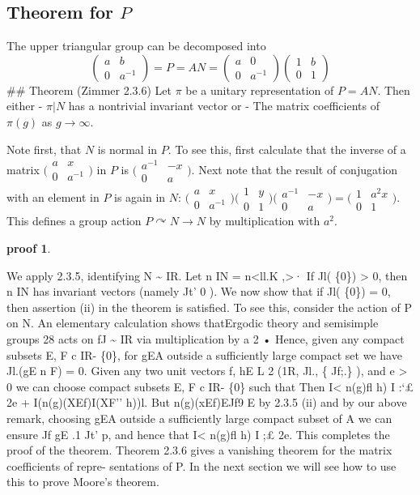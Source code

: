 \documentclass[
]{article}
\theoremstyle{break}
\theoremstyle{plain}
\newtheorem*{pf}{proof}
\newcommand{\ipmatrix}[1]{%
\ensuremath{\big(\begin{smallmatrix} #1 \end{smallmatrix}\big)}}
\begin{document}
\hypertarget{theorem-for-p}{%
\subsection{Theorem for \texorpdfstring{$P$}{P}}\label{theorem-for-p}}

The upper triangular group can be decomposed into
\[\begin{pmatrix}a & b \\ 0 & a^{-1}\end{pmatrix} =
P = AN =
\begin{pmatrix}a & 0 \\ 0 & a^{-1}\end{pmatrix} \begin{pmatrix}1 & b \\ 0 & 1\end{pmatrix}\]
\#\# Theorem (Zimmer 2.3.6) Let $\pi$ be a unitary representation of
$P = AN$. Then either - $\pi|N$ has a nontrivial invariant vector or
- The matrix coefficients of $\pi(g)$ as $g \rightarrow \infty$.

Note first, that $N$ is normal in $P$. To see this, first calculate that the
inverse of a matrix $\ipmatrix{ a & x \\ 0 & a^{-1} }$ in $P$ is $\ipmatrix{
a^{-1} & -x \\ 0 & a }$. Next note that the result of conjugation with an
element in $P$ is again in $N$: $\ipmatrix{ a & x \\ 0 & a^{-1} } \ipmatrix{1 &
y \\ 0 & 1} \ipmatrix{ a^{-1} & -x \\ 0 & a } = \ipmatrix{1 & a^2x \\ 0 & 1}$.
This defines a group action $P \curvearrowright N \rightarrow N$ by
multiplication with $a^2$.

\begin{pf}
  
\end{pf}


 We apply 2.3.5, identifying N \textasciitilde{}
IR. Let n IN = n\textless ll.K ,\textgreater· If Jl( \{0\})
\textgreater{} 0, then n IN has invariant vectors (namely Jt' 0 ). We
now show that if Jl( \{0\}) = 0, then assertion (ii) in the theorem is
satisfied. To see this, consider the action of P on N. An elementary
calculation shows thatErgodic theory and semisimple groups 28 acts on fJ
\textasciitilde{} IR via multiplication by a 2 • Hence, given any
compact subsets E, F c IR- \{0\}, for gEA outside a sufficiently large
compact set we have Jl.(gE n F) = 0. Given any two unit vectors f, hE L
2 (1R, Jl., \{ Jf;.\} ), and e \textgreater{} 0 we can choose compact
subsets E, F c IR- \{0\} such that Then I\textless{} n(g)fl h) I :`£ 2e
+ I(n(g)(XEf)I(XF'' h))l. But n(g)(xEf)EJf9 E by 2.3.5 (ii) and by our
above remark, choosing gEA outside a sufficiently large compact subset
of A we can ensure Jf gE .1 Jt' p, and hence that I\textless{} n(g)fl h)
I ;£ 2e. This completes the proof of the theorem. Theorem 2.3.6 gives a
vanishing theorem for the matrix coefficients of repre- sentations of P.
In the next section we will see how to use this to prove Moore's
theorem.
\end{document}
